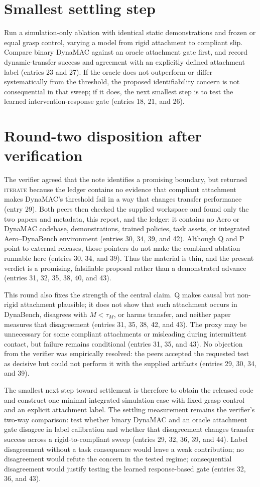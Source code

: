 \documentclass{article}
\begin{document}
\section*{Smallest settling step}
Run a simulation-only ablation with identical static demonstrations and frozen or equal grasp control, varying a model from rigid attachment to compliant slip. Compare binary DynaMAC against an oracle attachment gate first, and record dynamic-transfer success and agreement with an explicitly defined attachment label (entries 23 and 27). If the oracle does not outperform or differ systematically from the threshold, the proposed identifiability concern is not consequential in that sweep; if it does, the next smallest step is to test the learned intervention-response gate (entries 18, 21, and 26).

\section*{Round-two disposition after verification}
The verifier agreed that the note identifies a promising boundary, but returned \textsc{iterate} because the ledger contains no evidence that compliant attachment makes DynaMAC's threshold fail in a way that changes transfer performance (entry 29). Both peers then checked the supplied workspace and found only the two papers and metadata, this report, and the ledger: it contains no Aero or DynaMAC codebase, demonstrations, trained policies, task assets, or integrated Aero--DynaBench environment (entries 30, 34, 39, and 42). Although Q and P point to external releases, those pointers do not make the combined ablation runnable here (entries 30, 34, and 39). Thus the material is thin, and the present verdict is a promising, falsifiable proposal rather than a demonstrated advance (entries 31, 32, 35, 38, 40, and 43).

This round also fixes the strength of the central claim. Q makes causal but non-rigid attachment plausible; it does not show that such attachment occurs in DynaBench, disagrees with $M<\tau_M$, or harms transfer, and neither paper measures that disagreement (entries 31, 35, 38, 42, and 43). The proxy may be unnecessary for some compliant attachments or misleading during intermittent contact, but failure remains conditional (entries 31, 35, and 43). No objection from the verifier was empirically resolved: the peers accepted the requested test as decisive but could not perform it with the supplied artifacts (entries 29, 30, 34, and 39).

The smallest next step toward settlement is therefore to obtain the released code and construct one minimal integrated simulation case with fixed grasp control and an explicit attachment label. The settling measurement remains the verifier's two-way comparison: test whether binary DynaMAC and an oracle attachment gate disagree in label calibration and whether that disagreement changes transfer success across a rigid-to-compliant sweep (entries 29, 32, 36, 39, and 44). Label disagreement without a task consequence would leave a weak contribution; no disagreement would refute the concern in the tested regime; consequential disagreement would justify testing the learned response-based gate (entries 32, 36, and 43).
\end{document}
